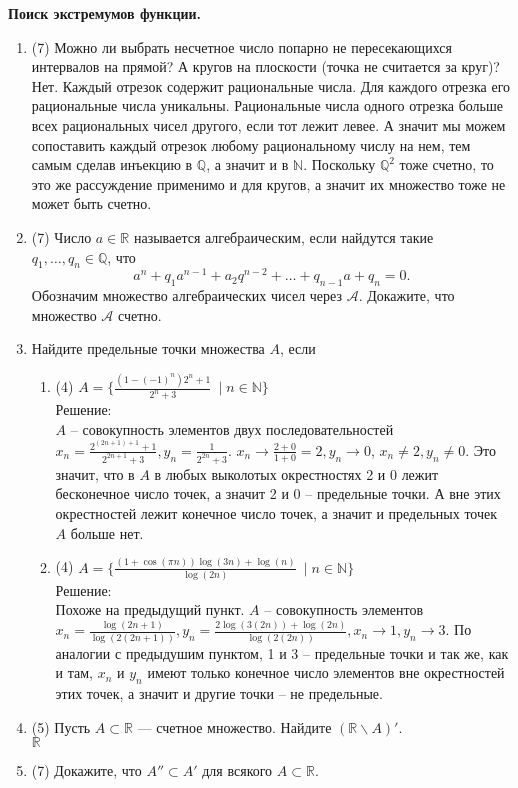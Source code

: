 \documentclass[a4paper]{article}
\begin{document}
\noindent\textbf{Поиск экстремумов функции.}

\begin{enumerate}
	\item (7) Можно ли выбрать несчетное число попарно не пересекающихся интервалов на прямой? А кругов на плоскости (точка не считается за круг)?\\
Нет. Каждый отрезок содержит рациональные числа. Для каждого отрезка его рациональные числа уникальны. Рациональные числа одного отрезка больше всех рациональных чисел другого, если тот лежит левее. А значит мы можем сопоставить каждый отрезок любому рациональному числу на нем, тем самым сделав инъекцию в $\mathbb Q$, а значит и в $\mathbb N$. Поскольку $\mathbb Q^2$ тоже счетно, то это же рассуждение применимо и для кругов, а значит их множество тоже не может быть счетно. 
	\item (7) Число $a\in \mathbb R$ называется алгебраическим, если найдутся такие $q_1,\dots,q_n\in \mathbb Q$, что
	\[
	    a^n + q_1a^{n-1} + a_2q^{n-2} + \dots + q_{n-1}a + q_n = 0.
	\]
	Обозначим множество алгебраических чисел через $\mathcal{A}$. Докажите, что множество $\mathcal{A}$ счетно.
	
	\item Найдите предельные точки множества $A$, если
	\begin{enumerate}
	    \item (4) $A = \{\frac{(1 - (-1)^n)2^n + 1}{2^n + 3}\ \mid n\in \mathbb N\}$\\
    Решение:\\
        $A$ -- совокупность элементов двух последовательностей $x_n = \frac{2^{(2n + 1)+1} + 1}{2^{2n+1} + 3}, y_n = \frac{1}{2^{2n} + 3}$. $x_n \rightarrow \frac{2 + 0}{1 + 0} = 2, y_n \rightarrow 0$, $x_n \neq 2, y_n \neq 0$. Это значит, что в $A$ в любых выколотых окрестностях 2 и 0 лежит бесконечное число точек, а значит 2 и 0 -- предельные точки. А вне этих окрестностей лежит конечное число точек, а значит и предельных точек $A$ больше нет.
        \item (4) $A = \{\frac{(1 + \cos (\pi n)) \log (3n) + \log(n)}{\log (2n)}\ \mid n\in \mathbb N\}$\\
    Решение:\\
    Похоже на предыдущий пункт. $A$ -- совокупность элементов $x_n = \frac{\log(2n+1)}{\log(2(2n+1))}, y_n = \frac{2\log(3(2n)) + \log(2n)}{\log(2(2n))}, x_n \rightarrow 1, y_n \rightarrow 3$. По аналогии с предыдушим пунктом, 1 и 3 -- предельные точки и так же, как и там, $x_n$ и $y_n$ имеют только конечное число элементов вне окрестностей этих точек, а значит и другие точки -- не предельные.
	\end{enumerate}
	
	\item (5) Пусть $A\subset \mathbb R$ --- счетное множество. Найдите $(\mathbb R\smallsetminus A)'$.\\
$\mathbb R$	
	\item (7) Докажите, что $A''\subset A'$ для всякого $A\subset \mathbb R$.
\end{enumerate}
\end{document}
